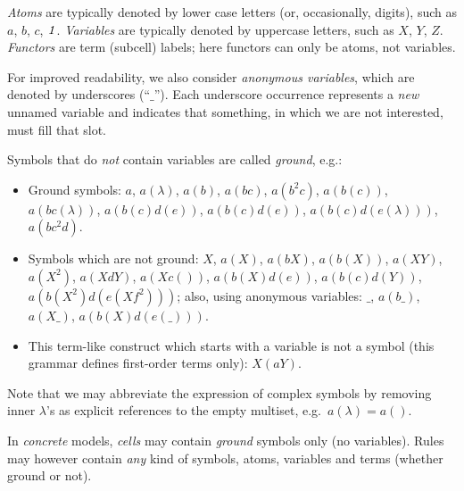 \emph{Atoms} are typically denoted by lower case letters (or, occasionally, digits), 
such as $a$, $b$, $c$, \(\mathit{1}\). 
\emph{Variables} are typically denoted by uppercase letters, 
such as $X$, $Y$, $Z$.
\emph{Functors} are term (subcell) labels; here functors can only be atoms, not variables.

For improved readability, we also consider \emph{anonymous variables}, which are denoted by underscores (``$\_$'').
Each underscore occurrence represents a \emph{new} unnamed variable
and indicates that something, in which we are not interested, must fill that slot.

Symbols that do \emph{not} contain variables are called \emph{ground}, e.g.:
\begin{itemize}
\item Ground symbols:
$a$, $a(\lambda)$, $a(b)$, $a(b c)$, $a(b^2 c)$, $a(b(c))$, $a(bc(\lambda))$, $a(b(c)d(e))$, $a(b(c)d(e))$, $a(b(c)d(e(\lambda)))$, $a(bc^2 d)$.

\smallskip
\item Symbols which are not ground:
$X$, $a(X)$, $a(bX)$, $a(b(X))$, $a(XY)$, $a(X^2)$, $a(XdY)$,  $a(Xc())$, $a(b(X)d(e))$, $a(b(c)d(Y))$, $a(b(X^2)d(e(Xf^2)))$;
also, using anonymous variables: $\_$, $a(b\_)$, $a(X\_)$, $a(b(X)d(e(\_)))$.

\smallskip
\item This term-like construct which starts with a variable is not a symbol (this grammar defines first-order terms only):
$X(a Y)$.
\end{itemize}

Note that we may abbreviate the expression of complex symbols 
by removing inner $\lambda$'s as explicit references to the empty multiset, 
e.g.~$a(\lambda) = a()$.

In \emph{concrete} models, \emph{cells} may contain \emph{ground} symbols only (no variables).
Rules may however contain \emph{any} kind of symbols, atoms, variables and terms (whether ground or not).

